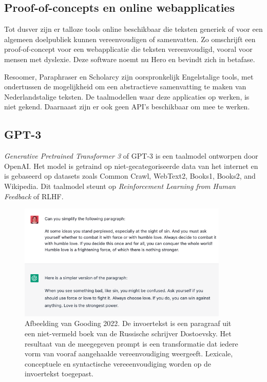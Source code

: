 \subsection{Proof-of-concepts en online webapplicaties}

Tot dusver zijn er talloze tools online beschikbaar die teksten generiek of voor een algemeen doelpubliek kunnen vereenvoudigen of samenvatten. Zo omschrijft \textcite{Bingel2018} een proof-of-concept voor een webapplicatie die teksten vereenvoudigd, vooral voor mensen met dyslexie. Deze software noemt nu Hero en bevindt zich in betafase.

Resoomer, Paraphraser en Scholarcy zijn oorspronkelijk Engelstalige tools, met ondertussen de mogelijkheid om een abstractieve samenvatting te maken van Nederlandstalige teksten. De taalmodellen waar deze applicaties op werken, is niet gekend. Daarnaast zijn er ook geen API's beschikbaar om mee te werken. %


\subsection{GPT-3}

\textit{Generative Pretrained Transformer 3} of GPT-3 is een taalmodel ontworpen door OpenAI. Het model is getraind op niet-gecategoriseerde data van het internet en is gebaseerd op datasets zoals Common Crawl, WebText2, Books1, Books2, and Wikipedia. Dit taalmodel steunt op \textit{Reinforcement Learning from Human Feedback} of RLHF. 


\begin{figure}[H]
	\includegraphics[width=10cm]{img/chatgpt-example-simplification-gooding.png}
	\caption{Afbeelding van Gooding 2022. De invoertekst is een paragraaf uit een niet-vermeld boek van de Russische schrijver Dostoevsky. Het resultaat van de meegegeven prompt is een transformatie dat iedere vorm van vooraf aangehaalde vereenvoudiging weergeeft. Lexicale, conceptuele en syntactische vereeenvoudiging worden op de invoertekst toegepast.}
\end{figure}

